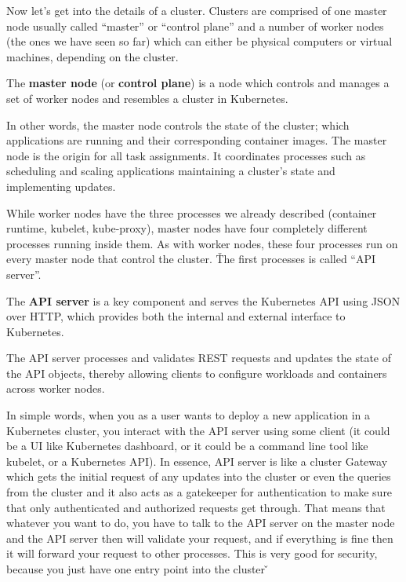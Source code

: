 Now let's get into the details of a cluster. Clusters are comprised of one master node usually called ``master'' or
``control plane'' and a number of worker nodes (the ones we have seen so far) which can either be physical computers
or virtual machines, depending on the cluster.

The \textbf{master node} (or \textbf{control plane}) is a node which controls and manages a set of worker nodes and
resembles a cluster in Kubernetes.
\ed

In other words, the master node controls the state of the cluster; which applications are running and their
corresponding container images. The master node is the origin for all task assignments. It coordinates processes such
as scheduling and scaling applications maintaining a cluster's state and implementing updates.


While worker nodes have the three processes we already described (container runtime, kubelet, kube-proxy), master
nodes have four completely different processes running inside them. As with worker nodes, these four processes run on
every master node that control the cluster. \v

The first processes is called ``API server''.

The \textbf{API server} is a key component and serves the Kubernetes API using JSON over HTTP, which provides both the
internal and external interface to Kubernetes.
\ed

The API server processes and validates REST requests and updates the state of the API objects, thereby allowing
clients to configure workloads and containers across worker nodes.


In simple words, when you as a user wants to deploy a new application in a Kubernetes cluster, you interact with the
API server using some client (it could be a UI like Kubernetes dashboard, or it could be a command line tool like
kubelet, or a Kubernetes API). In essence, API server is like a cluster Gateway which gets the initial request of any
updates into the cluster or even the queries from the cluster and it also acts as a gatekeeper for authentication to
make sure that only authenticated and authorized requests get through. That means that whatever you want to do, you
have to talk to the API server on the master node and the API server then will validate your request, and if
everything is fine then it will forward your request to other processes. This is very good for security, because you
just have one entry point into the cluster \v

